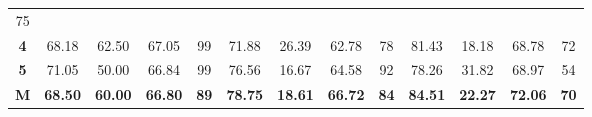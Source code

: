 \begin{table}[H]
{\begin{tabular}{ccccccccccccc}
			\multicolumn{1}{c|}{75} \\ \cline{2-13} 
			\multicolumn{1}{c|}{\cellcolor[HTML]{D9D9D9}\textbf{4}} &
			\multicolumn{1}{c|}{68.18} &
			\multicolumn{1}{c|}{62.50} &
			\multicolumn{1}{c|}{67.05} &
			\multicolumn{1}{c|}{99} &
			\multicolumn{1}{c|}{71.88} &
			\multicolumn{1}{c|}{26.39} &
			\multicolumn{1}{c|}{62.78} &
			\multicolumn{1}{c|}{78} &
			\multicolumn{1}{c|}{81.43} &
			\multicolumn{1}{c|}{18.18} &
			\multicolumn{1}{c|}{68.78} &
			\multicolumn{1}{c|}{72} \\ \cline{2-13} 
			\multicolumn{1}{c|}{\cellcolor[HTML]{D9D9D9}\textbf{5}} &
			\multicolumn{1}{c|}{71.05} &
			\multicolumn{1}{c|}{50.00} &
			\multicolumn{1}{c|}{66.84} &
			\multicolumn{1}{c|}{99} &
			\multicolumn{1}{c|}{76.56} &
			\multicolumn{1}{c|}{16.67} &
			\multicolumn{1}{c|}{64.58} &
			\multicolumn{1}{c|}{92} &
			\multicolumn{1}{c|}{78.26} &
			\multicolumn{1}{c|}{31.82} &
			\multicolumn{1}{c|}{68.97} &
			\multicolumn{1}{c|}{54} \\ \cline{2-13} 
			\multicolumn{1}{c|}{\cellcolor[HTML]{FFFF00}\textbf{M}} &
			\multicolumn{1}{c|}{\textbf{68.50}} &
			\multicolumn{1}{c|}{\textbf{60.00}} &
			\multicolumn{1}{c|}{\textbf{66.80}} &
			\multicolumn{1}{c|}{\textbf{89}} &
			\multicolumn{1}{c|}{\textbf{78.75}} &
			\multicolumn{1}{c|}{\textbf{18.61}} &
			\multicolumn{1}{c|}{\textbf{66.72}} &
			\multicolumn{1}{c|}{\textbf{84}} &
			\multicolumn{1}{c|}{\textbf{84.51}} &
			\multicolumn{1}{c|}{\textbf{22.27}} &
			\multicolumn{1}{c|}{\textbf{72.06}} &
			\multicolumn{1}{c|}{\textbf{70}} \\ \cline{2-13} 
		\end{tabular}%
	}
\end{table}